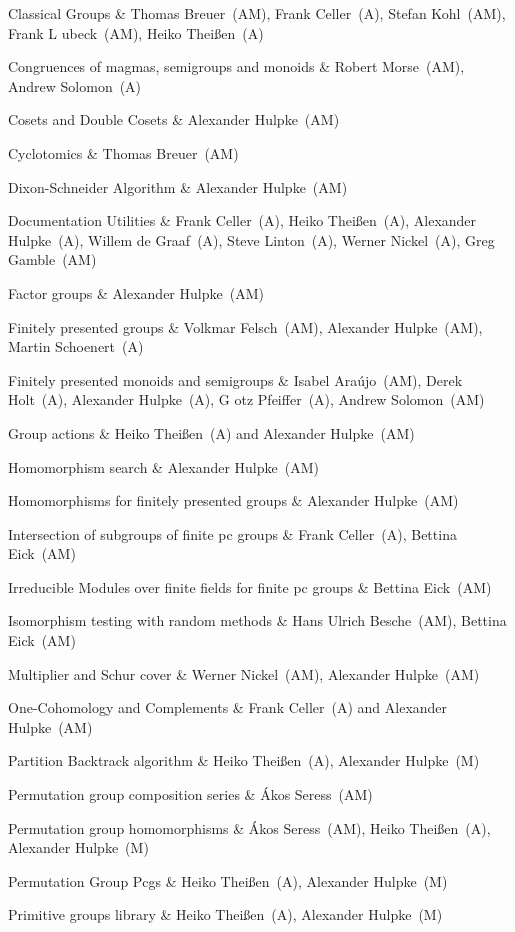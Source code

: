 Classical Groups &
Thomas Breuer~(AM), Frank Celler~(A), Stefan Kohl~(AM), 
Frank L{ u}beck~(AM), Heiko Thei{\ss}en~(A)

Congruences of magmas, semigroups and monoids &
Robert Morse~(AM), Andrew Solomon~(A)

Cosets and Double Cosets &
Alexander Hulpke~(AM)

Cyclotomics &
Thomas Breuer~(AM)

Dixon-Schneider Algorithm &
Alexander Hulpke~(AM)

Documentation Utilities &
Frank Celler~(A), Heiko Thei{\ss}en~(A), Alexander Hulpke~(A), 
Willem de Graaf~(A), Steve Linton~(A), Werner Nickel~(A), Greg Gamble~(AM)

Factor groups &
Alexander Hulpke~(AM)

Finitely presented groups &
Volkmar Felsch~(AM), Alexander Hulpke~(AM), Martin Schoenert~(A)

Finitely presented monoids and semigroups &
Isabel Ara{\'u}jo~(AM), Derek Holt~(A), Alexander Hulpke~(A), G{ o}tz Pfeiffer~(A), Andrew Solomon~(AM)

Group actions &
Heiko Thei{\ss}en~(A) and Alexander Hulpke~(AM)

Homomorphism search &
Alexander Hulpke~(AM)

Homomorphisms for finitely presented groups &
Alexander Hulpke~(AM)

Intersection of subgroups of finite pc groups &
Frank Celler~(A), Bettina Eick~(AM)

Irreducible Modules over finite fields for finite pc groups &
Bettina Eick~(AM)

Isomorphism testing with random methods &
Hans Ulrich Besche~(AM), Bettina Eick~(AM)

Multiplier and Schur cover &
Werner Nickel~(AM), Alexander Hulpke~(AM)

One-Cohomology and Complements &
Frank Celler~(A) and Alexander Hulpke~(AM)

Partition Backtrack algorithm &
Heiko Thei{\ss}en~(A), Alexander Hulpke~(M)

Permutation group composition series &
{\'A}kos Seress~(AM)

Permutation group homomorphisms &
{\'A}kos Seress~(AM), Heiko Thei{\ss}en~(A), Alexander Hulpke~(M)

Permutation Group Pcgs &
Heiko Thei{\ss}en~(A), Alexander Hulpke~(M)

Primitive groups library &
Heiko Thei{\ss}en~(A), Alexander Hulpke~(M)

